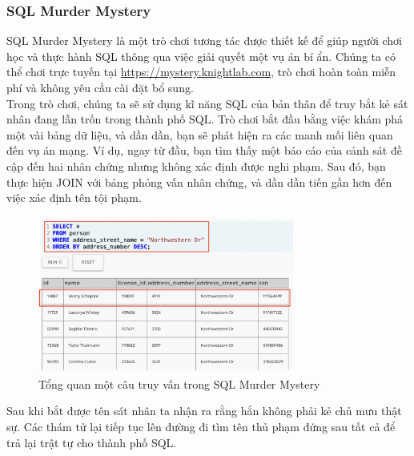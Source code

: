 \subsubsection{SQL Murder Mystery}
\hspace*{1cm} SQL Murder Mystery là một trò chơi tương tác được thiết kế để giúp người chơi học và thực hành SQL thông qua việc giải quyết một vụ án bí ẩn. Chúng ta có thể chơi trực tuyến tại \def\UrlFont{\bfseries}\url{https://mystery.knightlab.com}, trò chơi hoàn toàn miễn phí và không yêu cầu cài đặt bổ sung.\\
\hspace*{1cm} Trong trò chơi, chúng ta sẽ sử dụng kĩ năng SQL của bản thân để truy bắt kẻ sát nhân đang lẫn trốn trong thành phố SQL. Trò chơi bắt đầu bằng việc khám phá một vài bảng dữ liệu, và dần dần, bạn sẽ phát hiện ra các manh mối liên quan đến vụ án mạng. Ví dụ, ngay từ đầu, bạn tìm thấy một báo cáo của cảnh sát đề cập đến hai nhân chứng nhưng không xác định được nghi phạm. Sau đó, bạn thực hiện JOIN với bảng phỏng vấn nhân chứng, và dần dần tiến gần hơn đến việc xác định tên tội phạm.
\begin{figure}[H]
	\centering
	\includegraphics[width=0.75\textwidth]{Images/smm_play.png}
	\vspace{0.5cm}
	\caption{Tổng quan một câu truy vấn trong SQL Murder Mystery}
\end{figure}
\hspace*{1cm} Sau khi bắt được tên sát nhân ta nhận ra rằng hắn không phải kẻ chủ mưu thật sự. Các thám tử lại tiếp tục lên đường đi tìm tên thủ phạm đứng sau tất cả để trả lại trật tự cho thành phố SQL.
